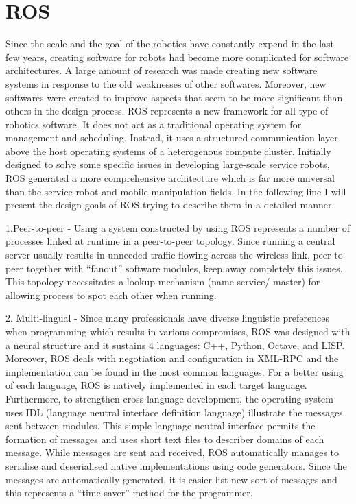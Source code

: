 \section{ROS}
\label{sec:ros}
	Since the scale and the goal of the robotics have constantly expend in the last few years, creating software for robots had become more complicated for software architectures. A large amount of research was made creating new software systems in response to the old weaknesses of other softwares. Moreover, new softwares were created to improve aspects that seem to be more significant than others in the design process. ROS represents a new framework for all type of robotics software. It does not act as a traditional operating system for management and scheduling. Instead, it uses a structured communication layer above the host operating systems of a heterogenous compute cluster. Initially designed to solve some specific issues in developing large-scale service robots, ROS generated a more comprehensive architecture which is far more  universal than the service-robot and mobile-manipulation fields. 
	In the following line I will present the design goals of ROS trying to describe them in a detailed manner. 

1.Peer-to-peer - Using a system constructed by using ROS represents a number of processes linked at runtime in a peer-to-peer topology. Since running a central server usually results in 
unneeded traffic flowing across the wireless link, peer-to-peer together with “fanout” software modules, keep away completely this issues. This topology necessitates 
a lookup mechanism (name service/ master) for allowing process to spot each other when running. 

2. Multi-lingual - Since many professionals have diverse  linguistic preferences when programming which results in various compromises, ROS was designed with a neural structure and it sustains 4 languages: C++, Python, Octave, and LISP. Moreover, ROS deals with negotiation and configuration in XML-RPC and the implementation can be found in the most common languages. For a better using of each language, ROS is natively implemented in each target language.  Furthermore, to strengthen cross-language development, the operating system uses IDL (language neutral interface definition language) illustrate the messages sent between modules. This simple language-neutral interface permits the formation of messages and uses short text files to describer domains of each message. While messages are sent and received, ROS automatically manages to serialise and deserialised native implementations using code generators. Since the messages are automatically generated, it is easier list new sort of messages  and this represents a “time-saver” method for the programmer. 

